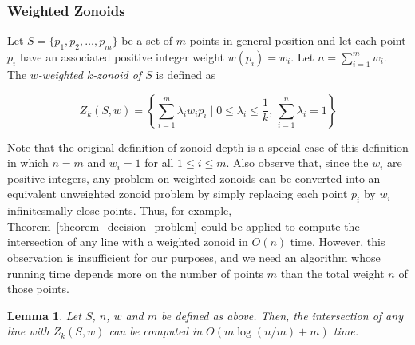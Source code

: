\documentclass{elsart}
\newtheorem{lemma}{Lemma}
\begin{document}
\subsubsection{Weighted Zonoids}
\label{section_decision}

Let $S = \{p_1, p_2, \ldots, p_m\}$ be a set of $m$ points in general
position and let each point $p_i$ have an associated positive integer
weight $w(p_i)=w_i$.  Let $n=\sum_{i=1}^m w_i$.  The \emph{$w$-weighted
$k$-zonoid of $S$} is defined as

\[ Z_k(S,w) = \left\{\sum_{i=1}^{m}\lambda_iw_ip_i \mid 0 \le \lambda_i \le \frac{1}{k},\, \sum_{i=1}^{n} \lambda_i = 1 \right\} \]

Note that the original definition of zonoid depth is a special case of
this definition in which $n=m$ and $w_i=1$ for all $1\le i\le m$.
Also observe that, since the $w_i$ are positive integers, any problem
on weighted zonoids can be converted into an equivalent unweighted
zonoid problem by simply replacing each point $p_i$ by $w_i$
infinitesmally close points. Thus, for example,
Theorem~\ref{theorem_decision_problem} could be applied to compute the
intersection of any line with a weighted zonoid in $O(n)$ time.
However, this observation is insufficient for our purposes, and we
need an algorithm whose running time depends more on the number of
points $m$ than the total weight $n$ of those points.

\begin{lemma}
Let $S$, $n$, $w$ and $m$ be defined as above.  Then, the intersection
of any line with $Z_k(S,w)$ can be computed in $O(m\log (n/m) + m)$
time.
\end{lemma}
\end{document}
